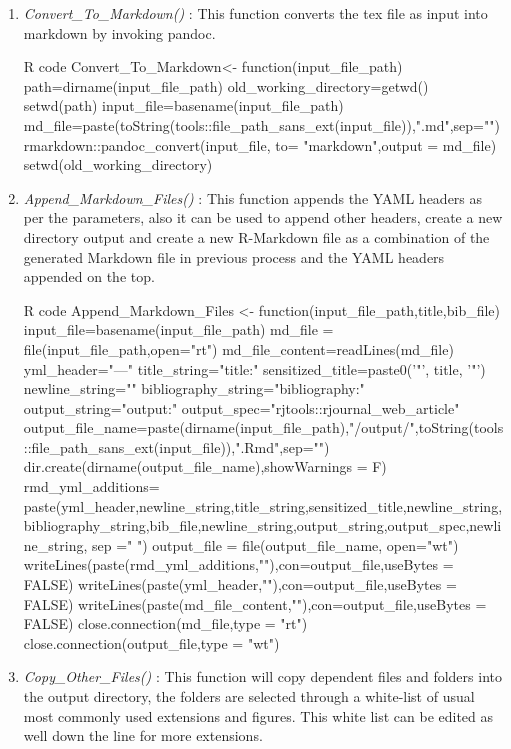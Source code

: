 \documentclass[12pt]{article}
\begin{document}
\begin{enumerate}[label = {  \color{MediumBlue} \textbf{\arabic*. }},align=left]
\begin{enumerate}[label = {  \color{MediumBlue} \textbf{\arabic*. }},align=left]
\item \textit{\color{DarkBlue}Convert\_To\_Markdown()} : This function converts the tex file as input into markdown by invoking pandoc.
   \begin{code}{R code}
Convert_To_Markdown<- function(input_file_path){
    path=dirname(input_file_path)
    old_working_directory=getwd()
    setwd(path)
    input_file=basename(input_file_path)
    md_file=paste(toString(tools::file_path_sans_ext(input_file)),".md",sep="")
    rmarkdown::pandoc_convert(input_file, to= "markdown",output = md_file)
    setwd(old_working_directory)
}
    \end{code}
\item \textit{\color{DarkBlue}Append\_Markdown\_Files()} : This function appends the YAML headers as per the parameters, also it can be used to append other headers, create a new directory output and create a new R-Markdown file as a combination of the generated Markdown file in previous process and the YAML headers appended on the top.
   \begin{code}{R code}
Append_Markdown_Files <- function(input_file_path,title,bib_file){
    input_file=basename(input_file_path)
    md_file = file(input_file_path,open="rt")
    md_file_content=readLines(md_file)
    yml_header="---"
    title_string="title:"
    sensitized_title=paste0('"', title, '"')
    newline_string="\n"
    bibliography_string="bibliography:"
    output_string="output:"
    output_spec="rjtools::rjournal_web_article"
    output_file_name=paste(dirname(input_file_path),"/output/",toString(tools::file_path_sans_ext(input_file)),".Rmd",sep="")
    dir.create(dirname(output_file_name),showWarnings = F)
    rmd_yml_additions= paste(yml_header,newline_string,title_string,sensitized_title,newline_string,bibliography_string,bib_file,newline_string,output_string,output_spec,newline_string, sep =" ")
    output_file = file(output_file_name, open="wt")
    writeLines(paste(rmd_yml_additions,""),con=output_file,useBytes = FALSE)
    writeLines(paste(yml_header,""),con=output_file,useBytes = FALSE)
    writeLines(paste(md_file_content,""),con=output_file,useBytes = FALSE)
    close.connection(md_file,type = "rt")
    close.connection(output_file,type = "wt")
}
    \end{code}
\item \textit{\color{DarkBlue}Copy\_Other\_Files()} : This function will copy dependent files and folders into the output directory, the folders are selected through a white-list of usual most commonly used extensions and figures. This white list can be edited as well down the line for more extensions.

\end{enumerate}
\end{enumerate}
\end{document}
